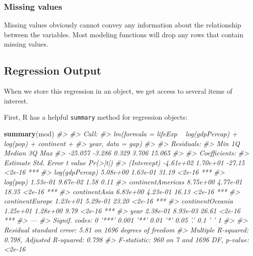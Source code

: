 \documentclass[
]{book}
\newenvironment{Shaded}{\begin{snugshade}}{\end{snugshade}}
\newcommand{\CommentTok}[1]{\textcolor[rgb]{0.56,0.35,0.01}{\textit{#1}}}
\newcommand{\KeywordTok}[1]{\textcolor[rgb]{0.13,0.29,0.53}{\textbf{#1}}}
\newcommand{\NormalTok}[1]{#1}
\begin{document}
\hypertarget{missing-values}{%
\subsubsection*{Missing values}\label{missing-values}}

Missing values obviously cannot convey any information about the relationship between the variables. Most modeling functions will drop any rows that contain missing values.

\hypertarget{regression-output}{%
\subsection{Regression Output}\label{regression-output}}

When we store this regression in an object, we get access to several items of interest.

First, R has a helpful \texttt{summary} method for regression objects:

\begin{Shaded}
\begin{Highlighting}[]
\KeywordTok{summary}\NormalTok{(mod)}
\CommentTok{#> }
\CommentTok{#> Call:}
\CommentTok{#> lm(formula = lifeExp ~ log(gdpPercap) + log(pop) + continent + }
\CommentTok{#>     year, data = gap)}
\CommentTok{#> }
\CommentTok{#> Residuals:}
\CommentTok{#>     Min      1Q  Median      3Q     Max }
\CommentTok{#> -25.057  -3.286   0.329   3.706  15.065 }
\CommentTok{#> }
\CommentTok{#> Coefficients:}
\CommentTok{#>                    Estimate Std. Error t value Pr(>|t|)    }
\CommentTok{#> (Intercept)       -4.61e+02   1.70e+01  -27.15   <2e-16 ***}
\CommentTok{#> log(gdpPercap)     5.08e+00   1.63e-01   31.19   <2e-16 ***}
\CommentTok{#> log(pop)           1.53e-01   9.67e-02    1.58     0.11    }
\CommentTok{#> continentAmericas  8.75e+00   4.77e-01   18.35   <2e-16 ***}
\CommentTok{#> continentAsia      6.83e+00   4.23e-01   16.13   <2e-16 ***}
\CommentTok{#> continentEurope    1.23e+01   5.29e-01   23.20   <2e-16 ***}
\CommentTok{#> continentOceania   1.25e+01   1.28e+00    9.79   <2e-16 ***}
\CommentTok{#> year               2.38e-01   8.93e-03   26.61   <2e-16 ***}
\CommentTok{#> ---}
\CommentTok{#> Signif. codes:  0 '***' 0.001 '**' 0.01 '*' 0.05 '.' 0.1 ' ' 1}
\CommentTok{#> }
\CommentTok{#> Residual standard error: 5.81 on 1696 degrees of freedom}
\CommentTok{#> Multiple R-squared:  0.798,  Adjusted R-squared:  0.798 }
\CommentTok{#> F-statistic:  960 on 7 and 1696 DF,  p-value: <2e-16}
\end{Highlighting}
\end{Shaded}
\end{document}
